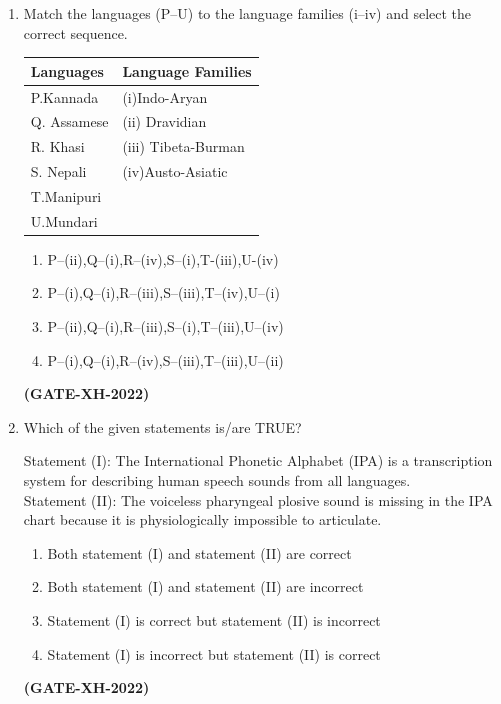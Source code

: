 \documentclass[journal]{IEEEtran}
\begin{document}
\begin{enumerate}
\item Match the languages (P–U) to the language families (i–iv) and select the correct sequence.\\ 
\begin{tabular}{|p{3cm}|p{4cm}|}
\hline
   Languages  & Language Families \\
   \hline
   P.Kannada  & (i)Indo-Aryan\\
   \hline
   Q. Assamese & (ii) Dravidian\\
   \hline
   R. Khasi & (iii) Tibeta-Burman\\
   \hline
   S. Nepali & (iv)Austo-Asiatic\\
   \hline
   T.Manipuri & \\
   \hline
   U.Mundari & \\
   \hline
\end{tabular}
\begin{multicols}{2}
\begin{enumerate}
\item P–(ii),Q–(i),R–(iv),S–(i),T-(iii),U-(iv)  
\item P–(i),Q–(i),R–(iii),S–(iii),T–(iv),U–(i)  
\item P–(ii),Q–(i),R–(iii),S–(i),T–(iii),U–(iv)  
\item P–(i),Q–(i),R–(iv),S–(iii),T–(iii),U–(ii)  
\end{enumerate}
\end{multicols}
\hfill\textbf{(GATE-XH-2022)}

\item Which of the given statements is/are TRUE?  

Statement (I): The International Phonetic Alphabet (IPA) is a transcription system for describing human speech sounds from all languages. \\
Statement (II): The voiceless pharyngeal plosive sound is missing in the IPA chart because it is physiologically impossible to articulate.  
\begin{enumerate}
\item Both statement (I) and statement (II) are correct  
\item Both statement (I) and statement (II) are incorrect  
\item Statement (I) is correct but statement (II) is incorrect  
\item Statement (I) is incorrect but statement (II) is correct  
\end{enumerate}
\hfill\textbf{(GATE-XH-2022)}


\end{enumerate}
\end{document}
